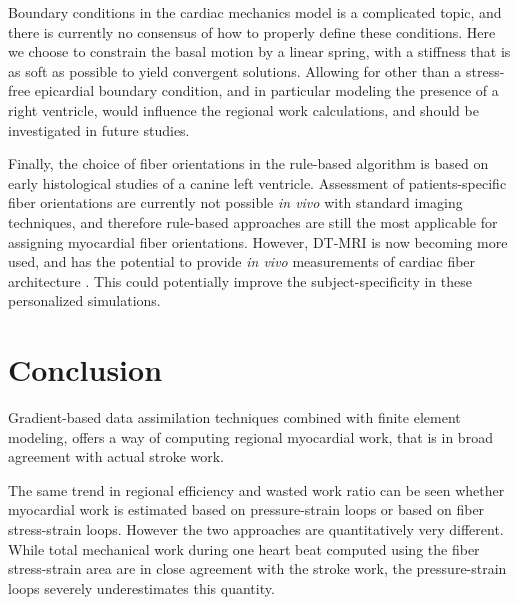 Boundary conditions in the cardiac mechanics model is a complicated
topic, and there is currently no consensus of how to properly define
these conditions. Here we choose to constrain the basal motion by a
linear spring, with a stiffness that is as soft as possible to yield
convergent solutions. Allowing for other than a stress-free epicardial
boundary condition, and in particular modeling the presence of a right
ventricle, would influence the regional work calculations, and should
be investigated in future studies.



Finally, the choice of fiber orientations in the rule-based algorithm is based
on early histological studies \cite{streeter1969fiber} of a canine left
ventricle. Assessment of patients-specific fiber orientations are
currently not possible \emph{in vivo} with standard imaging techniques,
and therefore rule-based approaches are still the most
applicable for assigning myocardial fiber orientations. However,
DT-MRI is now becoming more used, and has the potential to provide
\emph{in vivo} measurements of cardiac fiber architecture
\cite{toussaint2013vivo}. This could potentially improve the
subject-specificity in these personalized simulations.


\section{Conclusion}

Gradient-based data assimilation techniques combined with finite
element modeling, offers a way of computing regional myocardial
work, that is in broad agreement with actual stroke work.

The same trend in regional efficiency and wasted work ratio can be seen
whether myocardial work is estimated based on pressure-strain loops or
based on fiber stress-strain loops. However the two approaches are
quantitatively very different. While total mechanical work during one
heart beat computed using the fiber stress-strain area are in close
agreement with the stroke work, the pressure-strain loops severely
underestimates this quantity.

